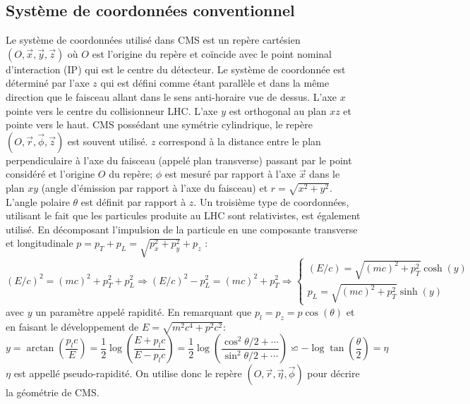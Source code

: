 \subsection{Système de coordonnées conventionnel}
Le système de coordonnées utilisé dans CMS est un repère cartésien $\left(O,\vec{x},\vec{y},\vec{z}\right)$ où $O$ est l'origine du repère et coïncide avec le point nominal d'interaction (IP) qui est le centre du détecteur. Le système de coordonnée est déterminé par l'axe $z$ qui est défini comme étant parallèle et dans la même direction que le faisceau allant dans le sens anti-horaire vue de dessus. L'axe $x$ pointe vers le centre du collisionneur LHC. L'axe $y$ est orthogonal au plan $xz$ et pointe vers le haut. CMS possédant une symétrie cylindrique, le repère $\left(O,\vec{r},\vec{\phi},\vec{z}\right)$ est souvent utilisé. $z$ correspond à la distance entre le plan perpendiculaire à l'axe du faisceau (appelé plan transverse) passant par le point considéré et l'origine $O$ du repère; $\phi$ est mesuré par rapport à l'axe $\vec{x}$ dans le plan $xy$ (angle d'émission par rapport à l'axe du faisceau) et $r=\sqrt{x^2+y^2}$. L'angle polaire $\theta$ est définit par rapport à $z$. Un troisième type de coordonnées, utilisant le fait que les particules produite au LHC sont relativistes, est également utilisé. En décomposant l'impulsion de la particule en une composante transverse et longitudinale $p=p_{T}+p_{L}=\sqrt{p_{x}^{2}+p_{y}^{2}}+p_{z}$ :
\begin{equation}
(E/c)^{2}=(mc)^{2}+p_{T}^{2}+p_{L}^{2}\Longrightarrow (E/c)^{2}-p_{L}^{2}=(mc)^{2}+p_{T}^{2}\Longrightarrow  \begin{cases}
\left(E/c \right)=\sqrt{\left(mc \right)^{2}+p_{T}^{2}}\cosh(y) \\
p_{L}=\sqrt{\left(mc \right)^{2}+p_{T}^{2}}\sinh(y)
\end{cases}
\end{equation}
avec $y$ un paramètre appelé rapidité. En remarquant que $p_{l}=p_{z}=p\cos(\theta)$ et en faisant le développement de $E=\sqrt{m^{2}c^{4}+p^{2}c^{2}}$:
\begin{equation}
y=\arctan\left(\frac{p_{l}c}{E}\right)=\frac{1}{2}\log\left(\frac{E+p_{l}c}{E-p_{l}c}\right)=\frac{1}{2}\log\left(\frac{\cos^2 \theta/2+\cdots}{\sin^2 \theta/2+\cdots}\right)\backsimeq-\log\tan\left(\frac{\theta}{2}\right)=\eta
\end{equation}
$\eta$ est appellé pseudo-rapidité. On utilise donc le repère $\left(O,\vec{r},\vec{\eta},\vec{\phi}\right)$ pour décrire la géométrie de CMS.

